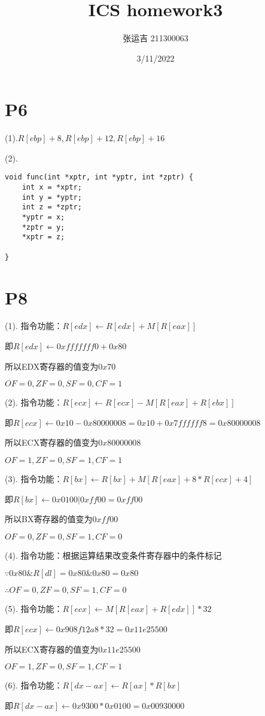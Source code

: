 \documentclass{article}
\title{ICS homework3}
\author{张运吉 211300063}
\date{3/11/2022}
\begin{document}
 
\maketitle %
\section{P6}	
(1).$R[ebp]+8, R[ebp]+12, R[ebp]+16$

(2).
\lstset{language=C}
\begin{lstlisting}
void func(int *xptr, int *yptr, int *zptr) {
	int x = *xptr;
	int y = *yptr;
	int z = *zptr;
	*yptr = x;
	*zptr = y;
	*xptr = z;		

}
\end{lstlisting}
\section{P8}
(1). 指令功能：$R[edx] \gets R[edx]+M[R[eax]]$

	 即$R[edx] \gets 0xfffffff0+0x80$
	 
	 所以EDX寄存器的值变为$0x70$	
	 
	 $OF=0,ZF=0,SF=0,CF=1$
	 
(2). 指令功能：$R[ecx] \gets R[ecx]-M[R[eax]+R[ebx]]$

即$R[ecx] \gets 0x10-0x80000008 = 0x10+0x7ffffff8=0x80000008$

所以ECX寄存器的值变为$0x80000008$	

$OF=1,ZF=0,SF=1,CF=1$

(3). 指令功能：$R[bx] \gets R[bx]+M[R[eax]+8*R[ecx]+4]$

即$R[bx] \gets 0x0100|0xff00=0xff00$

所以BX寄存器的值变为$0xff00$	

$OF=0,ZF=0,SF=1,CF=0$

(4). 指令功能：根据运算结果改变条件寄存器中的条件标记

$\because 0x80 \& R[dl]=0x80 \& 0x80=0x80$

$\therefore OF=0,ZF=0,SF=1,CF=0$

(5). 指令功能：$R[ecx] \gets M[R[eax]+R[edx]] * 32$

即$R[ecx] \gets 0x908f12a8*32 = 0x11e25500$

所以ECX寄存器的值变为$0x11e25500$	

$OF=1,ZF=0,SF=1,CF=1$

(6). 指令功能：$R[dx-ax] \gets R[ax]*R[bx]$

即$R[dx-ax] \gets 0x9300*0x0100 = 0x00930000$
\end{document}
